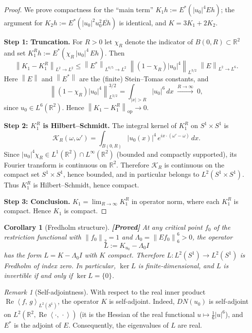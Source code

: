 \documentclass[12pt]{article}
\newtheorem{corollary}[theorem]{Corollary}
\theoremstyle{definition}
\theoremstyle{remark}
\newtheorem{remark}[theorem]{Remark}
\newcommand{\R}{\mathbb{R}}
\newcommand{\norm}[1]{\left\|#1\right\|}
\newcommand{\ip}[2]{\left\langle #1,\, #2\right\rangle}
\newcommand{\re}{\operatorname{Re}}
\newcommand{\proven}{\textbf{\color{teal}[Proved]}}
\begin{document}
\begin{proof}
  We prove compactness for the ``main term''
  $K_1 h:=E^*(|u_0|^4 Eh)$; the argument for
  $K_2 h:=E^*(|u_0|^2 u_0^2\overline{Eh})$ is identical,
  and $K=3K_1+2K_2$.

  \medskip\noindent
  \textbf{Step 1: Truncation.}
  For $R>0$ let $\chi_R$ denote the indicator of $B(0,R)\subset\R^2$ and
  set $K_1^R h:=E^*(\chi_R\,|u_0|^4\,Eh)$.  Then
  \[
    \norm{K_1-K_1^R}_{L^2\to L^2}
    \leq
    \norm{E^*}_{L^{6/5}\to L^2}
    \;\norm{(1-\chi_R)|u_0|^4}_{L^{3/2}}
    \;\norm{E}_{L^2\to L^6}.
  \]
  Here $\norm{E}$ and $\norm{E^*}$ are the (finite) Stein--Tomas constants,
  and
  \[
    \norm{(1-\chi_R)|u_0|^4}_{L^{3/2}}^{3/2}
    = \int_{|x|>R}|u_0|^6\,dx
    \;\xrightarrow{R\to\infty}\; 0,
  \]
  since $u_0\in L^6(\R^2)$.  Hence $\norm{K_1-K_1^R}_{\mathrm{op}}\to 0$.

  \medskip\noindent
  \textbf{Step 2: $K_1^R$ is Hilbert--Schmidt.}
  The integral kernel of $K_1^R$ on $S^1\times S^1$ is
  \[
    \mathcal K_R(\omega,\omega')
    = \int_{B(0,R)}|u_0(x)|^4\,e^{ix\cdot(\omega'-\omega)}\,dx.
  \]
  Since $|u_0|^4\chi_R\in L^1(\R^2)\cap L^\infty(\R^2)$ (bounded and
  compactly supported), its Fourier transform is continuous on $\R^2$.
  Therefore $\mathcal K_R$ is continuous on the compact set $S^1\times S^1$,
  hence bounded, and in particular belongs to $L^2(S^1\times S^1)$.
  Thus $K_1^R$ is Hilbert--Schmidt, hence compact.

  \medskip\noindent
  \textbf{Step 3: Conclusion.}
  $K_1=\lim_{R\to\infty}K_1^R$ in operator norm, where each $K_1^R$ is
  compact.  Hence $K_1$ is compact.
\end{proof}

\begin{corollary}[Fredholm structure]  \label{cor:fredholm}
  \proven\quad
  At any critical point $f_0$ of the restriction functional with
  $\norm{f_0}_2=1$ and $\Lambda_0=\norm{Ef_0}_6^6>0$, the operator
  \[
    L := K_{u_0} - \Lambda_0 I
  \]
  has the form $L=K-\Lambda_0 I$ with $K$ compact.  Therefore
  $L:L^2(S^1)\to L^2(S^1)$ is Fredholm of index zero.
  In particular, $\ker L$ is finite-dimensional, and $L$ is invertible
  if and only if $\ker L=\{0\}$.
\end{corollary}

\begin{remark}[Self-adjointness]
  With respect to the real inner product
  $\re\ip{f}{g}_{L^2(S^1)}$, the operator $K$ is self-adjoint.
  Indeed, $DN(u_0)$ is self-adjoint on $L^2(\R^2,\re\ip{\cdot}{\cdot})$
  (it is the Hessian of the real functional $u\mapsto\tfrac{1}{6}|u|^6$),
  and $E^*$ is the adjoint of $E$.  Consequently, the eigenvalues of $L$
  are real.
\end{remark}
\end{document}
